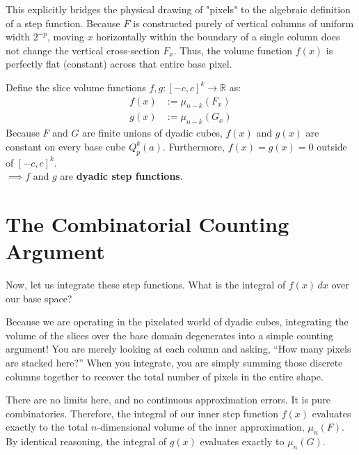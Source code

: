 \begin{didactic-insight}
This explicitly bridges the physical drawing of "pixels" to the algebraic definition of a step function. Because $F$ is constructed purely of vertical columns of uniform width $2^{-p}$, moving $x$ horizontally within the boundary of a single column does not change the vertical cross-section $F_x$. Thus, the volume function $f(x)$ is perfectly flat (constant) across that entire base pixel.
\end{didactic-insight}

\begin{math-stroke}
Define the slice volume functions $f, g: [-c, c]^k \to \mathbb{R}$ as:
\begin{align*}
f(x) &:= \mu_{n-k}(F_x) \\
g(x) &:= \mu_{n-k}(G_x)
\end{align*}
Because $F$ and $G$ are finite unions of dyadic cubes, $f(x)$ and $g(x)$ are constant on every base cube $Q_p^k(a)$. Furthermore, $f(x) = g(x) = 0$ outside of $[-c, c]^k$. \\
$\implies f$ and $g$ are \textbf{dyadic step functions}.
\end{math-stroke}

\section{The Combinatorial Counting Argument}

\begin{spoken-clean}[21:50 - 25:30]
Now, let us integrate these step functions. What is the integral of $f(x) \, dx$ over our base space? 

Because we are operating in the pixelated world of dyadic cubes, integrating the volume of the slices over the base domain degenerates into a simple counting argument! You are merely looking at each column and asking, ``How many pixels are stacked here?'' When you integrate, you are simply summing those discrete columns together to recover the total number of pixels in the entire shape. 

There are no limits here, and no continuous approximation errors. It is pure combinatorics. Therefore, the integral of our inner step function $f(x)$ evaluates exactly to the total $n$-dimensional volume of the inner approximation, $\mu_n(F)$. By identical reasoning, the integral of $g(x)$ evaluates exactly to $\mu_n(G)$.
\end{spoken-clean}

